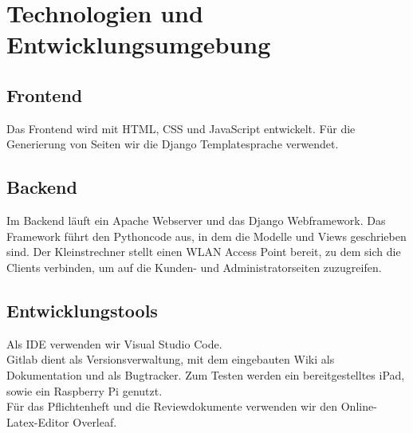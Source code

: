 \section{Technologien und Entwicklungsumgebung}
\subsection{Frontend}
Das Frontend wird mit HTML, CSS und JavaScript entwickelt. Für die Generierung von Seiten wir die Django Templatesprache verwendet.

\subsection{Backend}
Im Backend läuft ein Apache Webserver und das Django Webframework. Das Framework führt den Pythoncode aus, in dem die Modelle und Views geschrieben sind. Der Kleinstrechner stellt einen WLAN Access Point bereit, zu dem sich die Clients verbinden, um auf die Kunden- und Administratorseiten zuzugreifen.

\subsection{Entwicklungstools}
Als IDE verwenden wir Visual Studio Code. \\
Gitlab dient als Versionsverwaltung, mit dem eingebauten Wiki als Dokumentation und als Bugtracker. Zum Testen werden ein bereitgestelltes iPad, sowie ein Raspberry Pi genutzt. \\
Für das Pflichtenheft und die Reviewdokumente verwenden wir den Online-Latex-Editor Overleaf.